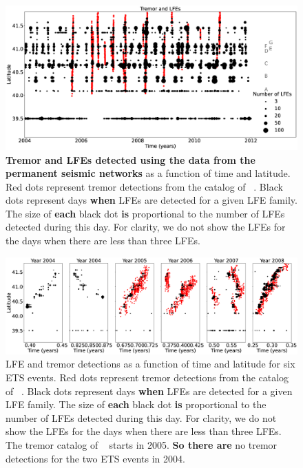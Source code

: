 \documentclass[draft]{agujournal2019}
\begin{document}
\begin{figure}
\noindent\includegraphics[width=\textwidth, trim={0cm 0cm 0cm 0cm},clip]{figures/tremor_nb_perm_3.eps}
\caption{\textbf{Tremor and LFEs detected using the data from the permanent seismic networks} as a function of time and latitude. Red dots represent tremor detections from the catalog of ~. Black dots represent days \textbf{when} LFEs are detected for a given LFE family. The size of \textbf{each} black dot \textbf{is} proportional to the number of LFEs detected during this day. For clarity, we do not show the LFEs for the days when there are less than three LFEs.}
\label{pngfiguresample}
\end{figure}

\begin{figure}
\noindent\includegraphics[width=\textwidth, trim={0cm 0cm 0cm 0cm},clip]{figures/zoom_ETS_events.eps}
\caption{LFE and tremor detections as a function of time and latitude for six ETS events. Red dots represent tremor detections from the catalog of ~. Black dots represent days \textbf{when} LFEs are detected for a given LFE family. The size of \textbf{each} black dot \textbf{is} proportional to the number of LFEs detected during this day. For clarity, we do not show the LFEs for the days when there are less than three LFEs. The tremor catalog of ~ starts in 2005. \textbf{So there are} no tremor detections for the two ETS events in 2004.}
\label{pngfiguresample}
\end{figure}
\end{document}
